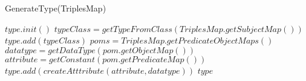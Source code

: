 \begin{algorithm}
\caption{GenerateType(TriplesMap)}
\label{algGenerateSchema}
\begin{algorithmic}
\STATE $type.init()$
\STATE $typeClass = getTypeFromClass(TriplesMap.getSubjectMap())$
\STATE $type.add(typeClass)$ 
\STATE $poms = TriplesMap.getPredicateObjectMaps()$
  \STATE $datatype = getDataType(pom.getObjectMap())$
  \STATE $attribute = getConstant(pom.getPredicateMap())$
  \STATE $type.add(createAtttribute(attribute, datatype))$
\ENDFOR
\RETURN $type$
\end{algorithmic}
\end{algorithm}